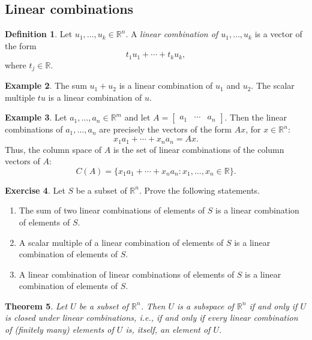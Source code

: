 \documentclass[fullpage]{amsart}
\newcommand{\RR}{\mathbb{R}}
\newtheorem{theorem}{Theorem}[section]
\theoremstyle{definition}
\newtheorem{definition}[theorem]{Definition}
\newtheorem{example}[theorem]{Example}
\newtheorem{exercise}[theorem]{Exercise}
\begin{document}
\subsection{Linear combinations}

\begin{definition}
  Let $u_1,\ldots,u_k\in\RR^n$.
A \emph{linear combination of $u_1,\ldots,u_k$} is a vector of the form
$$t_1u_1+\cdots +t_ku_k,$$
where $t_j\in \RR$.
\end{definition}

\begin{example}
  The sum $u_1+u_2$ is a linear combination of $u_1$ and $u_2$.
  The scalar multiple $tu$ is a linear combination of $u$.
\end{example}

\begin{example}\label{example:lin_combs_are_matvecs}
Let $a_1,\ldots,a_n\in\RR^m$ and let $A=\begin{bmatrix}a_1&\cdots &a_n\end{bmatrix}$.
  Then the linear combinations of $a_1,\ldots,a_n$ are precisely the vectors of the form $Ax$, for $x\in \RR^n$:
  $$
  x_1a_1+\cdots + x_na_n = Ax.
  $$
  Thus, the column space of $A$ is the set of linear combinations of the column vectors of $A$:
  $$
  C(A) = \{x_1a_1+\cdots+x_na_n : x_1, \ldots, x_n\in \RR\}.
  $$
\end{example}

\begin{exercise}\label{exerise:spans_are_subspaces}
Let $S$ be a subset of $\RR^n$. Prove the following statements.
\begin{enumerate}
  \item The sum of two linear combinations of elements of $S$ is a linear combination of elements of $S$.
  \item A scalar multiple of a linear combination of elements of $S$ is a linear combination of elements of $S$.
  \item A linear combination of linear combinations of elements of $S$ is a linear combination of elements of $S$.
\end{enumerate}
\end{exercise}

\begin{theorem}\label{theorem:subspaces_closed_under_lin_comb}
  Let $U$ be a subset of $\RR^n$.
  Then $U$ is a subspace of $\RR^n$ if and only if $U$ is \emph{closed under linear combinations}, i.e., if and only if every linear combination of (finitely many) elements of $U$ is, itself, an element of $U$.
\end{theorem}
\end{document}
